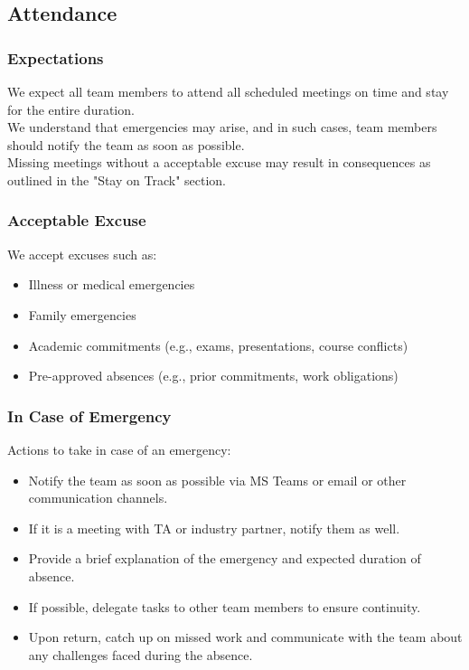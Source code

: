 \documentclass{article}
\begin{document}
\subsection*{Attendance}

\subsubsection*{Expectations}

We expect all team members to attend all scheduled meetings on time and stay for the entire duration. \\
We understand that emergencies may arise, and in such cases, team members should notify the team as soon as possible.\\
Missing meetings without a acceptable excuse may result in consequences as outlined in the "Stay on Track" section.

\subsubsection*{Acceptable Excuse}

We accept excuses such as:
\begin{itemize}
  \item Illness or medical emergencies
  \item Family emergencies
  \item Academic commitments (e.g., exams, presentations, course conflicts)
  \item Pre-approved absences (e.g., prior commitments, work obligations)
\end{itemize}

\subsubsection*{In Case of Emergency}

Actions to take in case of an emergency:
\begin{itemize}
  \item Notify the team as soon as possible via MS Teams or email or other communication channels.
  \item If it is a meeting with TA or industry partner, notify them as well.
  \item Provide a brief explanation of the emergency and expected duration of absence.
  \item If possible, delegate tasks to other team members to ensure continuity.
  \item Upon return, catch up on missed work and communicate with the team about any challenges faced during the absence.
\end{itemize}
\end{document}
